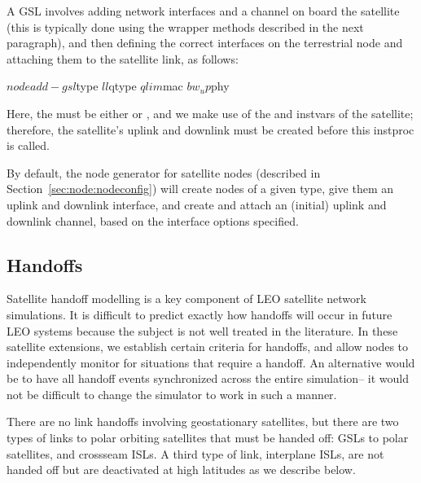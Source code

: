 A GSL involves adding network interfaces and a channel on board the
satellite (this is typically done using the wrapper methods described
in the next paragraph), and then defining the correct interfaces on
the terrestrial node and attaching them to the satellite link, as 
follows:
\begin{program}
$node add-gsl $type $ll $qtype $qlim $mac $bw_up $phy 
\end{program}
Here, the  must be either  or , 
and we make use
of the  and  instvars of the satellite;
therefore, the satellite's uplink and downlink must be created before
this instproc is called.

By default, the node generator for satellite nodes (described in
Section~\ref{sec:node:nodeconfig}) will create nodes of a 
given type, give them an uplink and
downlink interface, and create and attach an (initial) uplink and downlink
channel, based on the interface options specified.



\subsection{Handoffs }
\label{sec:satellite/usage/handoffs}

Satellite handoff modelling is a key component of LEO satellite network 
simulations.  It is difficult to predict exactly how handoffs will occur
in future LEO systems because the subject is not well treated in the
literature.  In these satellite extensions, we establish certain criteria for 
handoffs, and allow nodes to independently monitor for situations that 
require a handoff.  An alternative would be to have all handoff events
synchronized across the entire simulation-- it would not be difficult to 
change the simulator to work in such a manner.

There are no link handoffs involving geostationary satellites, but there 
are two types of links to polar orbiting satellites
that must be handed off:  GSLs to polar satellites, and crossseam ISLs.  
A third type of link, interplane ISLs, are not handed off but are deactivated
at high latitudes as we describe below.

